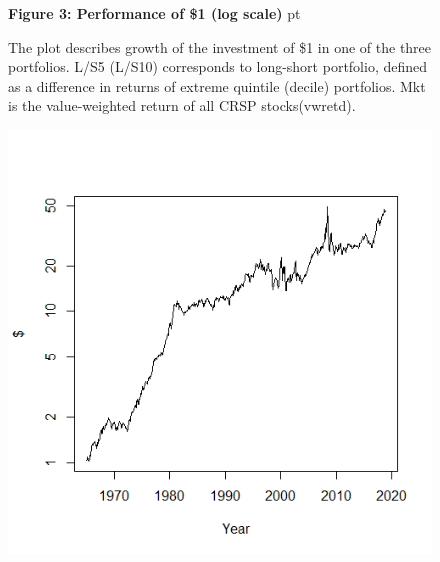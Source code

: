 \documentclass[12pt]{article}
\begin{document}
\begin{figure}
\textbf{Figure 3: Performance of \$1 (log scale)}
 pt
\begin{flushleft}
{The plot describes growth of the investment of \$1 in one of the three portfolios. L/S5 (L/S10) corresponds to long-short portfolio, defined as a difference in returns of extreme quintile (decile) portfolios. Mkt is the value-weighted return of all CRSP stocks(vwretd).}
\end{flushleft}
\centering
\includegraphics[width=1\textwidth]{Figure3.png}
\end{figure}
\end{document}
